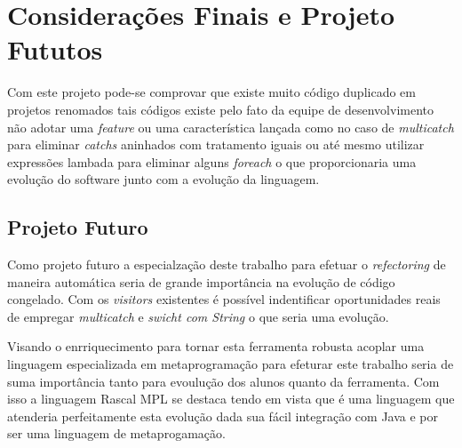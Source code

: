 \chapter{Considerações Finais e Projeto Fututos}
Com este projeto pode-se comprovar que existe muito código duplicado em projetos renomados tais códigos existe pelo fato da equipe de desenvolvimento não adotar uma \textit{feature} ou uma característica lançada como no caso de \textit{multicatch} para eliminar \textit{catchs} aninhados com tratamento iguais ou até mesmo utilizar expressões lambada para eliminar alguns \textit{foreach} o que proporcionaria uma evolução  do software junto com a evolução da linguagem.

\section{Projeto Futuro}
Como projeto futuro a especialzação deste trabalho para efetuar o \textit{refectoring} de maneira automática seria de grande importância na evolução de código congelado. Com os \textit{visitors} existentes é possível indentificar oportunidades reais de empregar \textit{multicatch} e \textit{swicht com String} o que seria uma evolução. 

Visando o enrriquecimento para tornar esta ferramenta robusta acoplar uma linguagem especializada em metaprogramação para efeturar este trabalho seria de suma importância tanto para evoulução dos alunos quanto da ferramenta. Com isso a linguagem Rascal MPL se destaca tendo em vista que é uma linguagem que atenderia perfeitamente esta evolução dada sua fácil integração com Java e por ser uma linguagem de metaprogamação.

